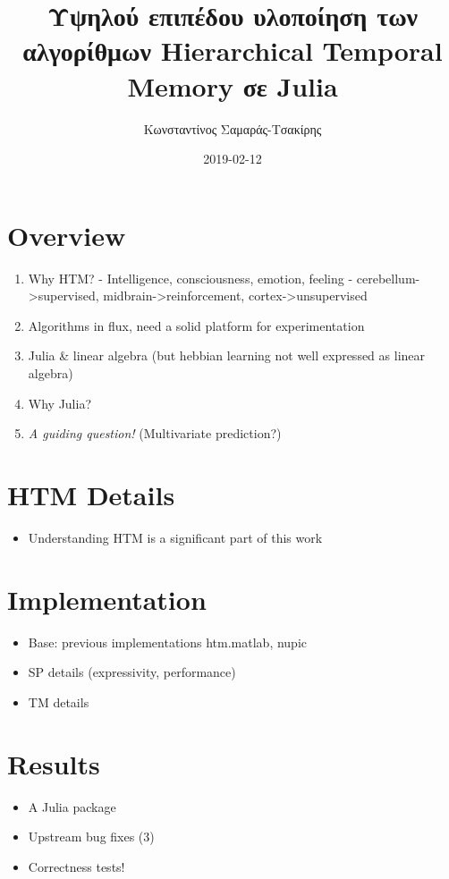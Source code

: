 \documentclass[a4paper,10pt]{article}
\title{Υψηλού επιπέδου υλοποίηση των αλγορίθμων Hierarchical Temporal Memory σε Julia}
\author{Κωνσταντίνος Σαμαράς-Τσακίρης}
\date{2019-02-12}
\begin{document}
\maketitle

\section{Overview}
\begin{enumerate}
  \item Why HTM?
  - Intelligence, consciousness, emotion, feeling
  - {cerebellum->supervised, midbrain->reinforcement, cortex->unsupervised}
  \item Algorithms in flux, need a solid platform for experimentation
  \item Julia \& linear algebra (but hebbian learning not well expressed as linear algebra)
  \item Why Julia?
  \item \textit{A guiding question!} (Multivariate prediction?)
\end{enumerate}

\section{HTM Details}
\begin{itemize}
  \item Understanding HTM is a significant part of this work
\end{itemize}

\section{Implementation}
\begin{itemize}
  \item Base: previous implementations {htm.matlab, nupic}
  \item SP details (expressivity, performance)
  \item TM details
\end{itemize}

\section{Results}
\begin{itemize}
  \item A Julia package
  \item Upstream bug fixes (3)
  \item Correctness tests!
\end{itemize}
\end{document}
